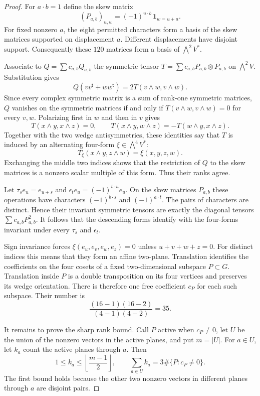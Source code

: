 \begin{proof}
For $a\cdot b=1$ define the skew matrix
\[
 (P_{a,b})_{u,w}=(-1)^{u\cdot b}\,\mathbf1_{w=u+a}.
\]
For fixed nonzero $a$, the eight permitted characters form a basis of the skew matrices supported on displacement $a$. Different displacements have disjoint support. Consequently these $120$ matrices form a basis of $\bigwedge^2V^*$.

Associate to $Q=\sum c_{a,b}Q_{a,b}$ the symmetric tensor
$T=\sum c_{a,b}P_{a,b}\otimes P_{a,b}$ on $\bigwedge^2V$. Substitution gives
\[
 Q(vv^{\mathsf t}+ww^{\mathsf t})=2T(v\wedge w,v\wedge w).
\]
Since every complex symmetric matrix is a sum of rank-one symmetric matrices, $Q$ vanishes on the symmetric matrices if and only if $T(v\wedge w,v\wedge w)=0$ for every $v,w$. Polarizing first in $w$ and then in $v$ gives
\[
 T(x\wedge y,x\wedge z)=0,\qquad
 T(x\wedge y,w\wedge z)=-T(w\wedge y,x\wedge z).
\]
Together with the two wedge antisymmetries, these identities say that $T$ is induced by an alternating four-form $\xi\in\bigwedge^4V^*$:
\[
 T_\xi(x\wedge y,z\wedge w)=\xi(x,y,z,w).
\]
Exchanging the middle two indices shows that the restriction of $Q$ to the skew matrices is a nonzero scalar multiple of this form. Thus their ranks agree.

Let $\tau_s e_u=e_{u+s}$ and $\epsilon_t e_u=(-1)^{t\cdot u}e_u$. On the skew matrices $P_{a,b}$ these operations have characters $(-1)^{b\cdot s}$ and $(-1)^{a\cdot t}$. The pairs of characters are distinct. Hence their invariant symmetric tensors are exactly the diagonal tensors $\sum c_{a,b}P_{a,b}^2$. It follows that the descending forms identify with the four-forms invariant under every $\tau_s$ and $\epsilon_t$.

Sign invariance forces $\xi(e_u,e_v,e_w,e_z)=0$ unless $u+v+w+z=0$. For distinct indices this means that they form an affine two-plane. Translation identifies the coefficients on the four cosets of a fixed two-dimensional subspace $P\subset G$. Translation inside $P$ is a double transposition on its four vertices and preserves its wedge orientation. There is therefore one free coefficient $c_P$ for each such subspace. Their number is
\[
 \frac{(16-1)(16-2)}{(4-1)(4-2)}=35.
\]

It remains to prove the sharp rank bound. Call $P$ active when $c_P\ne0$, let $U$ be the union of the nonzero vectors in the active planes, and put $m=|U|$. For $a\in U$, let $k_a$ count the active planes through $a$. Then
\begin{equation}\label{eq:plane-incidence}
 1\le k_a\le\left\lfloor\frac{m-1}{2}\right\rfloor,
 \qquad \sum_{a\in U}k_a=3\#\{P:c_P\ne0\}.
\end{equation}
The first bound holds because the other two nonzero vectors in different planes through $a$ are disjoint pairs.


\end{proof}
